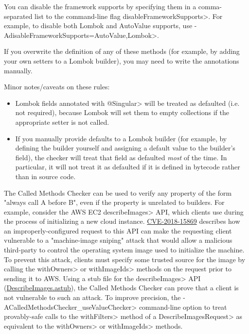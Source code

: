 You can disable the framework supports by specifying them in a comma-separated list to the
command-line flag \<disableFrameworkSupports>.  For example, to disable both Lombok and AutoValue supports,
use \<-AdisableFrameworkSupports=AutoValue,Lombok>.

If you overwrite the definition of any of these methods (for example, by adding your own setters to
a Lombok builder), you may need to write the annotations manually.

Minor notes/caveats on these rules:
\begin{itemize}
\item Lombok fields annotated with \<@Singular> will be treated as defaulted (i.e. not required), because
Lombok will set them to empty collections if the appropriate setter is not called.
\item If you manually provide defaults to a Lombok builder (for example, by defining the builder yourself
and assigning a default value to the builder's field), the checker will treat that field as defaulted
\emph{most} of the time. In particular, it will not treat it as defaulted if it is defined in bytecode rather
than in source code.
\end{itemize}


The Called Methods Checker can be used to verify any property of the form "always call A before B", even
if the property is unrelated to builders. For example, consider the AWS EC2 \<describeImages> API, which
clients use during the process of initializing a new cloud instance.
\href{https://cve.mitre.org/cgi-bin/cvename.cgi?name=CVE-2018-15869}{CVE-2018-15869} describes how an
improperly-configured request to this API can make the requesting client vulnerable to a "machine-image sniping"
attack that would allow a malicious third-party to control the operating system image used to initialize the
machine. To prevent this attack, clients must specify some trusted source for the image by calling the
\<withOwners> or \<withImageIds> methods on the request prior to sending it to AWS. Using a stub file for the
\<describeImages> API
(\href{https://github.com/typetools/checker-framework/blob/master/checker/src/main/java/org/checkerframework/calledmethods/DescribeImages.astub}{DescribeImages.astub}),
the Called Methods Checker can prove that a client is not vulnerable to such an attack. To improve precision,
the \<-ACalledMethodsChecker_useValueChecker> command-line option to treat provably-safe calls to the \<withFilters>
method of a \<DescribeImagesRequest> as equivalent to the \<withOwners> or \<withImageIds> methods.

